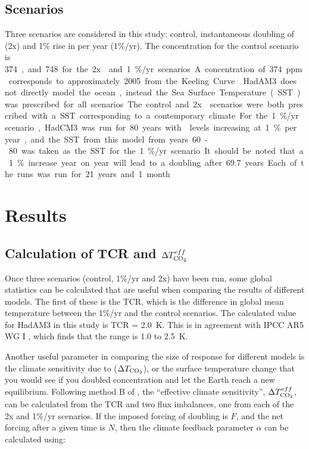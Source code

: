 \documentclass{article}
\begin{document}
\subsection{Scenarios}

Three scenarios are considered in this study: control, instantaneous doubling of  (2x) and 1\% rise in  per year (1\%/yr). The  concentration for the control scenario is \SI{374}, and \SI{748} for the 2x and 1\%/yr scenarios. A concentration of \SI{374}{ppm} corresponds to approximately 2005 from the Keeling Curve \parencite{keeling1976atmospheric}. HadAM3 does not directly model the ocean, instead the Sea Surface Temperature (SST) was prescribed for all scenarios. The control and 2x scenarios were both prescribed with a SST corresponding to a contemporary climate. For the 1\%/yr scenario, HadCM3 was run for \SI{80}{years} with  levels increasing at 1\% per year, and the SST from this model from years 60-80 was taken as the SST for the 1\%/yr scenario. It should be noted that a 1\% increase year on year will lead to a doubling after \SI{69.7}{years}.  Each of the runs was run for \SI{21}{years} and \SI{1}{month}.

\newpage
\section{Results}

\subsection{Calculation of TCR and $\Delta T^{eff}_{\ce{CO2}}$}

Once three scenarios (control, 1\%/yr and 2x) have been run, some global statistics can be calculated that are useful when comparing the results of different models. The first of these is the TCR, which is the difference in global mean temperature between the 1\%/yr and the control scenarios. The calculated value for HadAM3 in this study is TCR = \SI{2.0}{K}. This is in agreement with IPCC AR5 WG I \parencite{ipcc2014wg1}, which finds that the range is 1.0 to \SI{2.5}{K}.

Another useful parameter in comparing the size of response for different models is the climate sensitivity due to  ($\Delta T_{\ce{CO2}}$), or the surface temperature change that you would see if you doubled  concentration and let the Earth reach a new equilibrium. Following method B of \textcite{gregory2004new}, the ``effective climate sensitivity'', $\Delta T^{eff}_{\ce{CO2}}$, can be calculated from the TCR and two flux imbalances, one from each of the 2x and 1\%/yr scenarios. If the imposed forcing of doubling  is $F$, and the net forcing after a given time is $N$, then the climate feedback parameter $\alpha$ can be calculated using:
\end{document}
